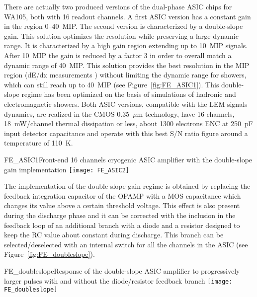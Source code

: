 There are actually two produced versions of the dual-phase ASIC
chips for WA105, both with 16 readout channels. A first ASIC version
has a constant gain in the region 0--40~MIP. The second version is
characterized by a double-slope gain. This solution optimizes the
resolution while preserving a large dynamic range. It is characterized
by a high gain region extending up to 10~MIP signals. After 10~MIP the
gain is reduced by a factor 3 in order to overall match a dynamic
range of 40~MIP. This solution provides the best resolution in the
MIP region (dE/dx measurements ) without limiting the dynamic range
for showers, which can still reach up to 40~MIP (see
Figure~\ref{fig:FE_ASIC1}). This double-slope regime has been
optimized on the basis of simulations of hadronic and electromagnetic
showers. Both ASIC versions, compatible with the LEM signals dynamics,
are realized in the CMOS 0.35~$\mu$m technology, have 16 channels,
18~mW/channel thermal dissipation or less, about 1300 electrons ENC at
250~pF input detector capacitance and operate with this best S/N ratio
figure around a temperature of 110~K.
\begin{cdrfigure}{FE_ASIC1}{Front-end 16 channels cryogenic ASIC amplifier with the double-slope gain implementation}
\texttt{[image: FE\_ASIC2]}
\end{cdrfigure}

The implementation of the double-slope gain regime is obtained by
replacing the feedback integration capacitor of the OPAMP with a MOS
capacitance which changes its value above a certain threshold
voltage. This effect is also present during the discharge phase and it
can be corrected with the inclusion in the feedback loop of an
additional branch with a diode and a resistor designed to keep the RC
value about constant during discharge. This branch can be
selected/deselected with an internal switch for all the channels in
the ASIC (see Figure~\ref{fig:FE_doubleslope}).
\begin{cdrfigure}{FE_doubleslope}{Response of the double-slope ASIC amplifier to progressively larger pulses with and without the diode/resistor feedback branch}
\texttt{[image: FE\_doubleslope]}
\end{cdrfigure}

